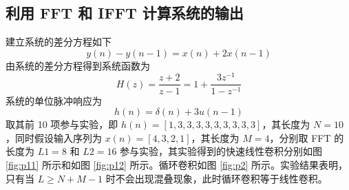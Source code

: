 \documentclass[12pt,AutoFakeBold]{article}
\begin{document}
\subsection{利用 FFT 和 IFFT 计算系统的输出} \label{sec:p2}

建立系统的差分方程如下
%
\begin{equation*}
y(n)-y(n-1)=x(n)+2x(n-1)
\end{equation*}
%
由系统的差分方程得到系统函数为
%
\begin{equation*}
H(z)=\frac{z+2}{z-1}=1+\frac{3z^{-1}}{1-z^{-1}}
\end{equation*}
%
系统的单位脉冲响应为
%
\begin{equation*}
h(n)=\delta(n)+3u(n-1)
\end{equation*}
%
取其前 10 项参与实验，即 $h(n)=[1,3,3,3,3,3,3,3,3,3]$，其长度为 $N=10$，同时假设输入序列为 $x(n)=[4,3,2,1]$，其长度为 $M=4$，分别取 FFT 的长度为 $L1=8$ 和 $L2=16$ 参与实验，其实验得到的快速线性卷积分别如图 \ref{fig:p11} 所示和如图 \ref{fig:p12} 所示。循环卷积如图 \ref{fig:p2} 所示。实验结果表明，只有当 $L\ge N+M-1$ 时不会出现混叠现象，此时循环卷积等于线性卷积。
\end{document}
